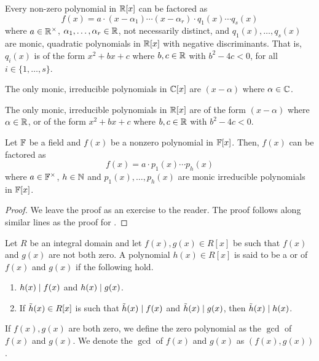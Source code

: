 \begin{theorem} \label{thm:FTA3}
    Every non-zero polynomial in $\mathbb{R}[x]$ can be factored as 
    \[
        f(x) = a \cdot (x-\alpha_1) \cdots (x-\alpha_r) \cdot q_1(x) \cdots q_s(x)
    \]
    where $a \in \mathbb{R}^{\times}$, $\alpha_1, \ldots, \alpha_r \in \mathbb{R}$, not necessarily distinct, and $q_1(x), \ldots, q_s(x)$ are monic, quadratic polynomials in $\mathbb{R}[x]$ with negative discriminants. That is, $q_i(x)$ is of the form $x^2 + bx + c$ where $b,c \in \mathbb{R}$ with $b^2 - 4c < 0$, for all $i \in \{1, \ldots, s\}$.
\end{theorem}

\begin{theorem} \label{thm:FTA4}
    The only monic, irreducible polynomials in $\mathbb{C}[x]$ are $(x-\alpha)$ where $\alpha \in \mathbb{C}$.
\end{theorem}

\begin{theorem} \label{thm:FTA5}
    The only monic, irreducible polynomials in $\mathbb{R}[x]$ are of the form $(x-\alpha)$ where $\alpha \in \mathbb{R}$, or of the form $x^2 + bx + c$ where $b,c \in \mathbb{R}$ with $b^2 - 4c < 0$.
\end{theorem}

\begin{theorem}
    Let $\mathbb{F}$ be a field and $f(x)$ be a nonzero polynomial in $\mathbb{F}[x]$. Then, $f(x)$ can be factored as
    \[
        f(x) = a \cdot p_1(x) \cdots p_h(x)
    \]
    where $a \in \mathbb{F}^{\times}$, $h \in \mathbb{N}$ and $p_1(x), \ldots, p_h(x)$ are monic irreducible polynomials in $\mathbb{F}[x]$.
\end{theorem}
\begin{proof}
    We leave the proof as an exercise to the reader. The proof follows along similar lines as the proof for .
\end{proof}

\begin{defn}
    Let $R$ be an integral domain and let $f(x), g(x) \in R[x]$ be such that $f(x)$ and $g(x)$ are not both zero. A polynomial $h(x) \in R[x]$ is said to be a  or  of $f(x)$ and $g(x)$ if the following hold.
    \begin{enumerate}
        \item $h(x) \mid f(x)$ and $h(x) \mid g(x)$.
        \item If $\Tilde{h}(x) \in R[x]$ is such that $\Tilde{h}(x) \mid f(x)$ and $\Tilde{h}(x) \mid g(x)$, then $\Tilde{h}(x) \mid h(x)$.
    \end{enumerate}
    If $f(x), g(x)$ are both zero, we define the zero polynomial as the $\gcd$ of $f(x)$ and $g(x)$. We denote the $\gcd$ of $f(x)$ and $g(x)$ as $\left( f(x), g(x) \right)$.
\end{defn}

